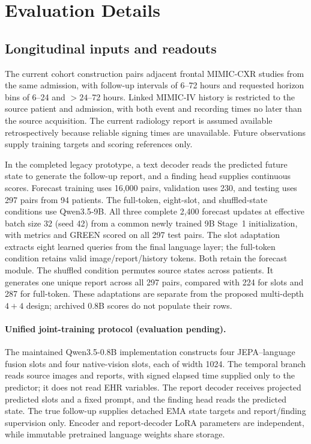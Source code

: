 \section{Evaluation Details}
\label{app:protocol}

\subsection{Longitudinal inputs and readouts}

The current cohort construction pairs adjacent frontal MIMIC-CXR studies from the same admission, with follow-up intervals of 6--72 hours and requested horizon bins of 6--24 and $>24$--72 hours. Linked MIMIC-IV history is restricted to the source patient and admission, with both event and recording times no later than the source acquisition. The current radiology report is assumed available retrospectively because reliable signing times are unavailable. Future observations supply training targets and scoring references only.

In the completed legacy prototype, a text decoder reads the predicted future state to generate the follow-up report,
and a finding head supplies continuous scores. Forecast training uses 16,000
pairs, validation uses 230, and testing uses 297 pairs from 94 patients. The
full-token, eight-slot, and shuffled-state conditions use Qwen3.5-9B.
All three complete 2,400 forecast updates at effective batch size 32 (seed 42)
from a common newly trained 9B Stage~1 initialization, with metrics and GREEN
scored on all 297 test pairs. The slot adaptation
extracts eight learned queries from the final language layer; the full-token
condition retains valid image/report/history tokens. Both retain the forecast
module. The shuffled condition permutes source states across patients.
It generates one unique report across all 297 pairs, compared with 224 for
slots and 287 for full-token. These adaptations are separate from the proposed
multi-depth $4+4$ design; archived 0.8B scores do not populate their rows.

\paragraph{Unified joint-training protocol (evaluation pending).}
The maintained Qwen3.5-0.8B implementation constructs four JEPA--language
fusion slots and four native-vision slots, each of width 1024. The temporal
branch reads source images and reports, with signed elapsed time supplied only
to the predictor; it does not read EHR variables. The report decoder receives
projected predicted slots and a fixed prompt, and the finding head reads the
predicted state. The true follow-up supplies detached EMA state targets and
report/finding supervision only. Encoder and report-decoder LoRA parameters
are independent, while immutable pretrained language weights share storage.

